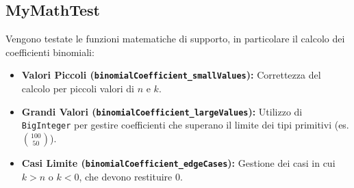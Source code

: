 \subsection{MyMathTest}
Vengono testate le funzioni matematiche di supporto, in particolare il calcolo dei coefficienti binomiali:
\begin{itemize}
    \item \textbf{Valori Piccoli (\texttt{binomialCoefficient\_smallValues}):} Correttezza del calcolo per piccoli valori di $n$ e $k$.
    \item \textbf{Grandi Valori (\texttt{binomialCoefficient\_largeValues}):} Utilizzo di \texttt{BigInteger} per gestire coefficienti che superano il limite dei tipi primitivi (es. $\binom{100}{50}$).
    \item \textbf{Casi Limite (\texttt{binomialCoefficient\_edgeCases}):} Gestione dei casi in cui $k > n$ o $k < 0$, che devono restituire $0$.
\end{itemize}
